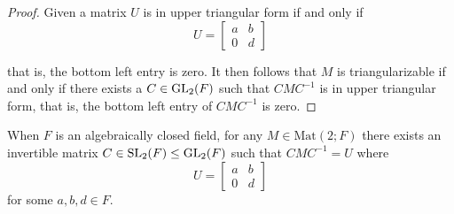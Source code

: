 \begin{proof}
\leanok
    Given a matrix $U$ is in upper triangular form if and only if
    \[
    U = \begin{bmatrix}
    a & b\\
    0 & d
    \end{bmatrix}
    \]
    
    that is, the bottom left entry is zero. It then follows that $M$ is triangularizable if and only if
    there exists a $C \in \operatorname{GL}_2(F)$ such that $C M C^{-1}$ is in upper triangular form, that is, the bottom left entry of $C M C^{-1}$ is zero. 
\end{proof}


\begin{lemma}
\label{isTriangularizable_of_algClosed}
\leanok
    When $F$ is an algebraically closed field, 
    for any $M \in \textrm{Mat}(2; F)$ there exists an invertible matrix $C \in \operatorname{SL}_2(F) \le \operatorname{GL}_2(F)$ such that $C M C^{-1} = U$ where
    \[
    U = \begin{bmatrix}
        a & b\\
        0 & d
    \end{bmatrix}\] for some $a, b, d \in F$.
\end{lemma}
